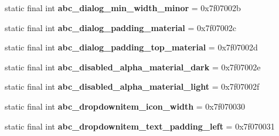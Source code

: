 \begin{DoxyCompactItemize}
\item 
\hypertarget{classandroid_1_1support_1_1v7_1_1appcompat_1_1_r_1_1dimen_ab83da246a302d81238b96aa8902849d5}{}static final int {\bfseries abc\+\_\+dialog\+\_\+min\+\_\+width\+\_\+minor} = 0x7f07002b\label{classandroid_1_1support_1_1v7_1_1appcompat_1_1_r_1_1dimen_ab83da246a302d81238b96aa8902849d5}

\item 
\hypertarget{classandroid_1_1support_1_1v7_1_1appcompat_1_1_r_1_1dimen_ad1288246c4d8bb4e2586275198e17cf2}{}static final int {\bfseries abc\+\_\+dialog\+\_\+padding\+\_\+material} = 0x7f07002c\label{classandroid_1_1support_1_1v7_1_1appcompat_1_1_r_1_1dimen_ad1288246c4d8bb4e2586275198e17cf2}

\item 
\hypertarget{classandroid_1_1support_1_1v7_1_1appcompat_1_1_r_1_1dimen_a679ac16cbd922ac7f229594ceef4692a}{}static final int {\bfseries abc\+\_\+dialog\+\_\+padding\+\_\+top\+\_\+material} = 0x7f07002d\label{classandroid_1_1support_1_1v7_1_1appcompat_1_1_r_1_1dimen_a679ac16cbd922ac7f229594ceef4692a}

\item 
\hypertarget{classandroid_1_1support_1_1v7_1_1appcompat_1_1_r_1_1dimen_af692674ee9dd6bfe88f44b3abf41b713}{}static final int {\bfseries abc\+\_\+disabled\+\_\+alpha\+\_\+material\+\_\+dark} = 0x7f07002e\label{classandroid_1_1support_1_1v7_1_1appcompat_1_1_r_1_1dimen_af692674ee9dd6bfe88f44b3abf41b713}

\item 
\hypertarget{classandroid_1_1support_1_1v7_1_1appcompat_1_1_r_1_1dimen_a28eacd87805e60b3350cf55e7e60ff05}{}static final int {\bfseries abc\+\_\+disabled\+\_\+alpha\+\_\+material\+\_\+light} = 0x7f07002f\label{classandroid_1_1support_1_1v7_1_1appcompat_1_1_r_1_1dimen_a28eacd87805e60b3350cf55e7e60ff05}

\item 
\hypertarget{classandroid_1_1support_1_1v7_1_1appcompat_1_1_r_1_1dimen_ac3283f5b742838d313ac74aa12c129ca}{}static final int {\bfseries abc\+\_\+dropdownitem\+\_\+icon\+\_\+width} = 0x7f070030\label{classandroid_1_1support_1_1v7_1_1appcompat_1_1_r_1_1dimen_ac3283f5b742838d313ac74aa12c129ca}

\item 
\hypertarget{classandroid_1_1support_1_1v7_1_1appcompat_1_1_r_1_1dimen_ab4f69e00dfa34a3c6f6a34a4f39275f8}{}static final int {\bfseries abc\+\_\+dropdownitem\+\_\+text\+\_\+padding\+\_\+left} = 0x7f070031\label{classandroid_1_1support_1_1v7_1_1appcompat_1_1_r_1_1dimen_ab4f69e00dfa34a3c6f6a34a4f39275f8}


\end{DoxyCompactItemize}
